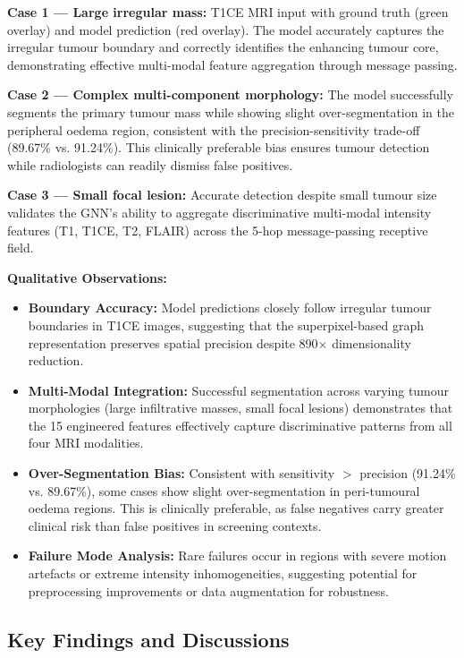 \textbf{Case 1 — Large irregular mass:} T1CE MRI input with ground truth (green overlay) and model prediction (red overlay). The model accurately captures the irregular tumour boundary and correctly identifies the enhancing tumour core, demonstrating effective multi-modal feature aggregation through message passing.

\textbf{Case 2 — Complex multi-component morphology:} The model successfully segments the primary tumour mass while showing slight over-segmentation in the peripheral oedema region, consistent with the precision-sensitivity trade-off (89.67\% vs. 91.24\%). This clinically preferable bias ensures tumour detection while radiologists can readily dismiss false positives.

\textbf{Case 3 — Small focal lesion:} Accurate detection despite small tumour size validates the GNN's ability to aggregate discriminative multi-modal intensity features (T1, T1CE, T2, FLAIR) across the 5-hop message-passing receptive field.

\textbf{Qualitative Observations:}
\begin{itemize}
    \item \textbf{Boundary Accuracy:} Model predictions closely follow irregular tumour boundaries in T1CE images, suggesting that the superpixel-based graph representation preserves spatial precision despite 890$\times$ dimensionality reduction.

    \item \textbf{Multi-Modal Integration:} Successful segmentation across varying tumour morphologies (large infiltrative masses, small focal lesions) demonstrates that the 15 engineered features effectively capture discriminative patterns from all four MRI modalities.

    \item \textbf{Over-Segmentation Bias:} Consistent with sensitivity $>$ precision (91.24\% vs. 89.67\%), some cases show slight over-segmentation in peri-tumoural oedema regions. This is clinically preferable, as false negatives carry greater clinical risk than false positives in screening contexts.

    \item \textbf{Failure Mode Analysis:} Rare failures occur in regions with severe motion artefacts or extreme intensity inhomogeneities, suggesting potential for preprocessing improvements or data augmentation for robustness.
\end{itemize}


\subsection{Key Findings and Discussions}

